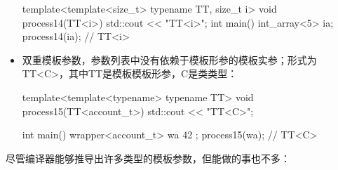 \begin{itemize}
\begin{cpp}
template<template<size_t> typename TT, size_t i>
void process14(TT<i>) { std::cout << "TT<i>\n"; }
int main()
{
	int_array<5> ia{};
	process14(ia); // TT<i>
}
\end{cpp}
  \item 双重模板参数，参数列表中没有依赖于模板形参的模板实参；形式为TT<C>，其中TT是模板模板形参，C是类类型：

\begin{cpp}
template<template<typename> typename TT>
void process15(TT<account_t>) { std::cout << "TT<C>\n"; }

int main()
{
	wrapper<account_t> wa{ {42} };
	process15(wa); // TT<C>
}
\end{cpp}
\end{itemize}

尽管编译器能够推导出许多类型的模板参数，但能做的事也不多：

